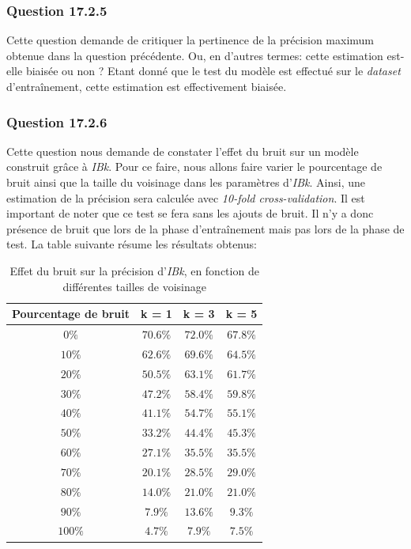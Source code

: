 \documentclass[11pt,a4paper]{article}
\begin{document}
			\subsubsection*{Question 17.2.5}
			
				Cette question demande de critiquer la pertinence de la précision maximum obtenue dans la question précédente. Ou, en d'autres termes: cette estimation est-elle biaisée ou non ?
				Etant donné que le test du modèle est effectué sur le \textit{dataset} d'entraînement, cette estimation est effectivement biaisée.
				
			\newpage
				
			\subsubsection*{Question 17.2.6}
			
				Cette question nous demande de constater l'effet du bruit sur un modèle construit grâce à \textit{IBk}. Pour ce faire, nous allons faire varier le pourcentage de bruit ainsi que la taille du voisinage dans les paramètres d'\textit{IBk}. Ainsi, une estimation de la précision sera calculée avec \textit{10-fold cross-validation}. Il est important de noter que ce test se fera sans les ajouts de bruit. Il n'y a donc présence de bruit que lors de la phase d'entraînement mais pas lors de la phase de test. La table suivante résume les résultats obtenus: 
			
				\begin{table}[h]
					\centering
					\caption{Effet du bruit sur la précision d'\textit{IBk}, en fonction de différentes tailles de voisinage}
					\label{tab-IBk-noise}
					\begin{tabular}{|c|c|c|c|}
						\hline
						Pourcentage de bruit & k = 1  & k = 3  & k = 5  \\
						\hline
						$0\%$ & $70.6\%$ & $72.0\%$ & $67.8\%$ \\
						\hline
						$10\%$ & $62.6\%$ & $69.6\%$ & $64.5\%$ \\
						\hline
						$20\%$ & $50.5\%$ & $63.1\%$ & $61.7\%$ \\
						\hline
						$30\%$ & $47.2\%$ & $58.4\%$ & $59.8\%$ \\
						\hline
						$40\%$ & $41.1\%$ & $54.7\%$ & $55.1\%$  \\
						\hline
						$50\%$ & $33.2\%$ & $44.4\%$ & $45.3\%$ \\
						\hline 
						$60\%$ & $27.1\%$ & $35.5\%$ & $35.5\%$ \\
						\hline 
						$70\%$ & $20.1\%$ & $28.5\%$ & $29.0\%$ \\
						\hline 
						$80\%$ & $14.0\%$ & $21.0\%$ & $21.0\%$ \\
						\hline 
						$90\%$ & $7.9\%$ & $13.6\%$ & $9.3\%$ \\
						\hline 
						$100\%$ & $4.7\%$ & $7.9\%$ & $7.5\%$ \\
						\hline 
					\end{tabular}
				\end{table}
				
\end{document}
